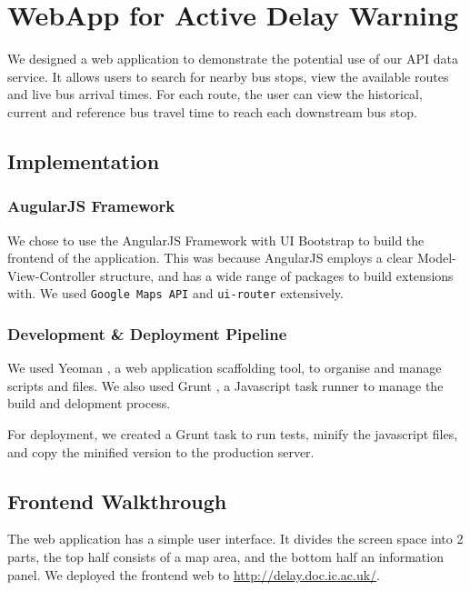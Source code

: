 \chapter{WebApp for Active Delay Warning}
\label{ch:mobile_app}

\par We designed a web application to demonstrate the potential use of our API data service. It allows users to search for nearby bus stops, view the available routes and live bus arrival times. For each route, the user can view the historical, current and reference bus travel time to reach each downstream bus stop.

\section{Implementation}
\subsection{AugularJS Framework}
\par We chose to use the AngularJS Framework \cite{angularjs} with UI Bootstrap \cite{bootstrap} to build the frontend of the application. This was because AngularJS employs a clear Model-View-Controller structure, and has a wide range of packages to build extensions with. We used \texttt{Google Maps API} and \texttt{ui-router} extensively.

\subsection{Development \& Deployment Pipeline}
\par We used Yeoman \cite{yeoman}, a web application scaffolding tool, to organise and manage scripts and files. We also used Grunt \cite{grunt}, a Javascript task runner to manage the build and delopment process.

\par For deployment, we created a Grunt task to run tests, minify the javascript files, and copy the minified version to the production server.

\section{Frontend Walkthrough}
\par The web application has a simple user interface. It divides the screen space into 2 parts, the top half consists of a map area, and the bottom half an information panel. We deployed the frontend web to \url{http://delay.doc.ic.ac.uk/}.


